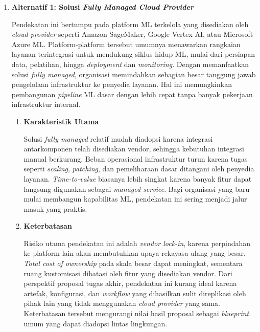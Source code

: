\vspace{0.5em}
\begin{enumerate}
    \item \textbf{Alternatif 1: Solusi \textit{Fully Managed Cloud Provider}}

    Pendekatan ini bertumpu pada platform ML terkelola yang disediakan oleh \textit{cloud provider} seperti Amazon SageMaker, Google Vertex AI, atau Microsoft Azure ML. Platform-platform tersebut umumnya menawarkan rangkaian layanan terintegrasi untuk mendukung siklus hidup ML, mulai dari persiapan data, pelatihan, hingga \textit{deployment} dan \textit{monitoring}. Dengan memanfaatkan solusi \textit{fully managed}, organisasi memindahkan sebagian besar tanggung jawab pengelolaan infrastruktur ke penyedia layanan. Hal ini memungkinkan pembangunan \textit{pipeline} ML dasar dengan lebih cepat tanpa banyak pekerjaan infrastruktur internal.

    \vspace{0.5em}
    \begin{enumerate}[label=\alph*)]
        \item \textbf{Karakteristik Utama}

        Solusi \textit{fully managed} relatif mudah diadopsi karena integrasi antarkomponen telah disediakan vendor, sehingga kebutuhan integrasi manual berkurang. Beban operasional infrastruktur turun karena tugas seperti \textit{scaling}, \textit{patching}, dan pemeliharaan dasar ditangani oleh penyedia layanan. \textit{Time-to-value} biasanya lebih singkat karena banyak fitur dapat langsung digunakan sebagai \textit{managed service}. Bagi organisasi yang baru mulai membangun kapabilitas ML, pendekatan ini sering menjadi jalur masuk yang praktis.

        \vspace{0.5em}

        \item \textbf{Keterbatasan}

        Risiko utama pendekatan ini adalah \textit{vendor lock-in}, karena perpindahan ke platform lain akan membutuhkan upaya rekayasa ulang yang besar. \textit{Total cost of ownership} pada skala besar dapat meningkat, sementara ruang kustomisasi dibatasi oleh fitur yang disediakan vendor. Dari perspektif proposal tugas akhir, pendekatan ini kurang ideal karena artefak, konfigurasi, dan \textit{workflow} yang dihasilkan sulit direplikasi oleh pihak lain yang tidak menggunakan \textit{cloud provider} yang sama. Keterbatasan tersebut mengurangi nilai hasil proposal sebagai \textit{blueprint} umum yang dapat diadopsi lintas lingkungan.
        

\end{enumerate}
\end{enumerate}
